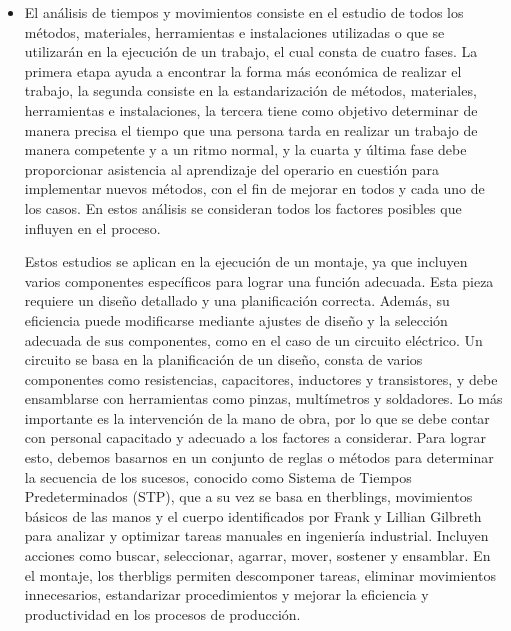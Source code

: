     \begin{itemize}
        \item El análisis de tiempos y movimientos consiste en el estudio de todos los métodos, materiales, herramientas e instalaciones utilizadas o que se utilizarán en la ejecución de un trabajo, el cual consta de cuatro fases. La primera etapa ayuda a encontrar la forma más económica de realizar el trabajo, la segunda consiste en la estandarización de métodos, materiales, herramientas e instalaciones, la tercera tiene como objetivo determinar de manera precisa el tiempo que una persona tarda en realizar un trabajo de manera competente y a un ritmo normal, y la cuarta y última fase debe proporcionar asistencia al aprendizaje del operario en cuestión para implementar nuevos métodos, con el fin de mejorar en todos y cada uno de los casos. En estos análisis se consideran todos los factores posibles que influyen en el proceso.
        
        Estos estudios se aplican en la ejecución de un montaje, ya que incluyen varios componentes específicos para lograr una función adecuada. Esta pieza requiere un diseño detallado y una planificación correcta. Además, su eficiencia puede modificarse mediante ajustes de diseño y la selección adecuada de sus componentes, como en el caso de un circuito eléctrico. Un circuito se basa en la planificación de un diseño, consta de varios componentes como resistencias, capacitores, inductores y transistores, y debe ensamblarse con herramientas como pinzas, multímetros y soldadores. Lo más importante es la intervención de la mano de obra, por lo que se debe contar con personal capacitado y adecuado a los factores a considerar. Para lograr esto, debemos basarnos en un conjunto de reglas o métodos para determinar la secuencia de los sucesos, conocido como Sistema de Tiempos Predeterminados (STP), que a su vez se basa en therblings, movimientos básicos de las manos y el cuerpo identificados por Frank y Lillian Gilbreth para analizar y optimizar tareas manuales en ingeniería industrial. Incluyen acciones como buscar, seleccionar, agarrar, mover, sostener y ensamblar. En el montaje, los therbligs permiten descomponer tareas, eliminar movimientos innecesarios, estandarizar procedimientos y mejorar la eficiencia y productividad en los procesos de producción.
         \cite{estudio}
    

\end{itemize}
